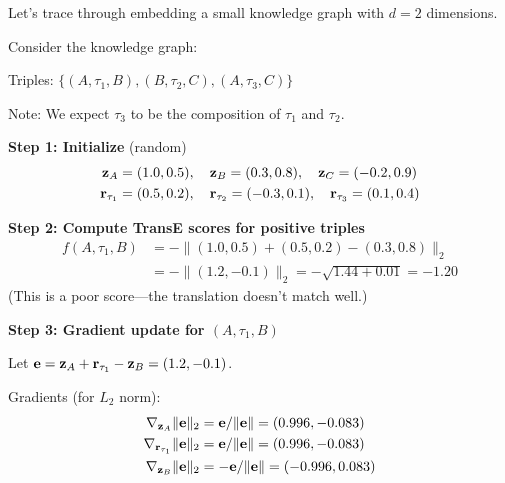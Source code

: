 \begin{notechapter}
Let's trace through embedding a small knowledge graph with $d = 2$ dimensions.

\begin{example}
Consider the knowledge graph:
\begin{center}
\end{center}

Triples: $\{(A, \tau_1, B), (B, \tau_2, C), (A, \tau_3, C)\}$

Note: We expect $\tau_3$ to be the composition of $\tau_1$ and $\tau_2$.

\textbf{Step 1: Initialize} (random)
\begin{align*}
\mathbf{z}_A &= (1.0, 0.5), \quad \mathbf{z}_B = (0.3, 0.8), \quad \mathbf{z}_C = (-0.2, 0.9) \\
\mathbf{r}_{\tau_1} &= (0.5, 0.2), \quad \mathbf{r}_{\tau_2} = (-0.3, 0.1), \quad \mathbf{r}_{\tau_3} = (0.1, 0.4)
\end{align*}

\textbf{Step 2: Compute TransE scores for positive triples}
\begin{align*}
f(A, \tau_1, B) &= -\|(1.0, 0.5) + (0.5, 0.2) - (0.3, 0.8)\|_2 \\
&= -\|(1.2, -0.1)\|_2 = -\sqrt{1.44 + 0.01} = -1.20
\end{align*}
(This is a poor score---the translation doesn't match well.)

\textbf{Step 3: Gradient update for $(A, \tau_1, B)$}

Let $\mathbf{e} = \mathbf{z}_A + \mathbf{r}_{\tau_1} - \mathbf{z}_B = (1.2, -0.1)$.

Gradients (for $L_2$ norm):
\begin{align*}
\nabla_{\mathbf{z}_A} \|\mathbf{e}\|_2 &= \mathbf{e}/\|\mathbf{e}\| = (0.996, -0.083) \\
\nabla_{\mathbf{r}_{\tau_1}} \|\mathbf{e}\|_2 &= \mathbf{e}/\|\mathbf{e}\| = (0.996, -0.083) \\
\nabla_{\mathbf{z}_B} \|\mathbf{e}\|_2 &= -\mathbf{e}/\|\mathbf{e}\| = (-0.996, 0.083)
\end{align*}


\end{example}
\end{notechapter}
